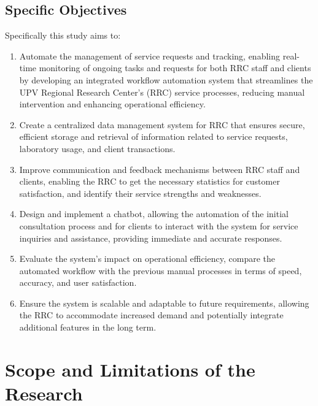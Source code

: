 \subsection{Specific Objectives}
\label{sec:specificobjectives}

Specifically this study aims to:

\begin{enumerate}
   \item Automate the management of service requests and tracking, enabling real-time monitoring of ongoing tasks and requests for both RRC staff and clients by developing an integrated workflow automation system that streamlines the UPV Regional Research Center's (RRC) service processes, reducing manual intervention and enhancing operational efficiency.
   
   \item Create a centralized data management system for RRC that ensures secure, efficient storage and retrieval of information related to service requests, laboratory usage, and client transactions.
   
   \item Improve communication and feedback mechanisms between RRC staff and clients, enabling the RRC to get the necessary statistics for customer satisfaction, and identify their service strengths and weaknesses.
   
   \item Design and implement a chatbot, allowing the automation of the initial consultation process and for clients to interact with the system for service inquiries and assistance, providing immediate and accurate responses.
   
   \item Evaluate the system’s impact on operational efficiency, compare the automated workflow with the previous manual processes in terms of speed, accuracy, and user satisfaction.
   
   \item Ensure the system is scalable and adaptable to future requirements, allowing the RRC to accommodate increased demand and potentially integrate additional features in the long term.
   
\end{enumerate}


\section{Scope and Limitations of the Research}
\label{sec:scopelimitations}

